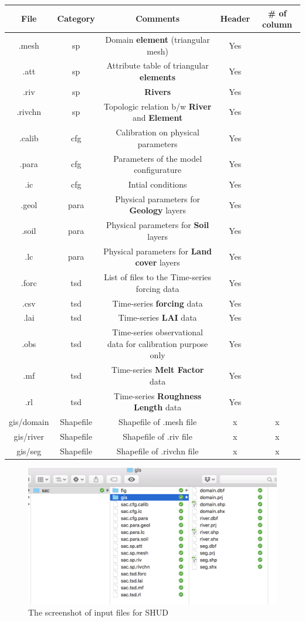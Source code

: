 \documentclass[]{scrbook}
\begin{document}
\begin{longtable}[]{@{}ccccc@{}}
\toprule
File & Category & Comments & Header & \# of column\tabularnewline
\midrule
\endhead
.mesh & sp & Domain \textbf{element} (triangular mesh) & Yes
&\tabularnewline
.att & sp & Attribute table of triangular \textbf{elements} & Yes
&\tabularnewline
.riv & sp & \textbf{Rivers} & Yes &\tabularnewline
.rivchn & sp & Topologic relation b/w \textbf{River} and
\textbf{Element} & Yes &\tabularnewline
.calib & cfg & Calibration on physical parameters & Yes &\tabularnewline
.para & cfg & Parameters of the model configurature & Yes
&\tabularnewline
.ic & cfg & Intial conditions & Yes &\tabularnewline
.geol & para & Physical parameters for \textbf{Geology} layers & Yes
&\tabularnewline
.soil & para & Physical parameters for \textbf{Soil} layers & Yes
&\tabularnewline
.lc & para & Physical parameters for \textbf{Land cover} layers & Yes
&\tabularnewline
.forc & tsd & List of files to the Time-series forcing data & Yes
&\tabularnewline
.csv & tsd & Time-series \textbf{forcing} data & Yes &\tabularnewline
.lai & tsd & Time-series \textbf{LAI} data & Yes &\tabularnewline
.obs & tsd & Time-series observational data for calibration purpose only
& Yes &\tabularnewline
.mf & tsd & Time-series \textbf{Melt Factor} data & Yes &\tabularnewline
.rl & tsd & Time-series \textbf{Roughness Length} data & Yes
&\tabularnewline
gis/domain & Shapefile & Shapefile of .mesh file & x & x\tabularnewline
gis/river & Shapefile & Shapefile of .riv file & x & x\tabularnewline
gis/seg & Shapefile & Shapefile of .rivchn file & x & x\tabularnewline
\bottomrule
\end{longtable}

\begin{figure}
\centering
\includegraphics{Fig/IO/Inputfiles.png}
\caption{The screenshot of input files for SHUD}
\end{figure}
\end{document}
